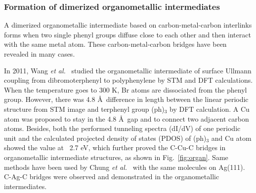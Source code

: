 \documentclass[%
 reprint,
 amsmath,amssymb,
 aps,
prb,
]{revtex4-2}
\begin{document}


\subsubsection{Formation of dimerized organometallic intermediates}

A dimerized organometallic intermediate based on carbon-metal-carbon interlinks forms when two single phenyl groups diffuse close to each other and then interact with the same metal atom. These carbon-metal-carbon bridges have been revealed in many cases. 

In 2011, Wang \textit{et al.}~\cite{jacs2011} studied the organometallic intermediate of surface Ullmann coupling from dibromoterphenyl to polyphenylene by STM and DFT calculations. When the temperature goes to 300 K, Br atoms are dissociated from the phenyl group. However, there was 4.8 \AA\ difference in length between the linear periodic structure from STM image and terphenyl group (ph)$_{3}$ by DFT calculation. A Cu atom was proposed to stay in the 4.8 \AA\ gap and to connect two adjacent carbon atoms. Besides, both the performed tunneling spectra (dI/dV) of one periodic unit and the calculated projected density of states (PDOS) of (ph)$_{3}$ and Cu atom showed the value at ~2.7 eV, which further proved the C-Cu-C bridges in organometallic intermediate structures, as shown in Fig.~\ref{fig:organ}. Same methods have been used by Chung \textit{et al.}~\cite{PCCP2012} with the same molecules on Ag(111). C-Ag-C bridges were observed and demonstrated in the organometallic intermediates.
\end{document}
